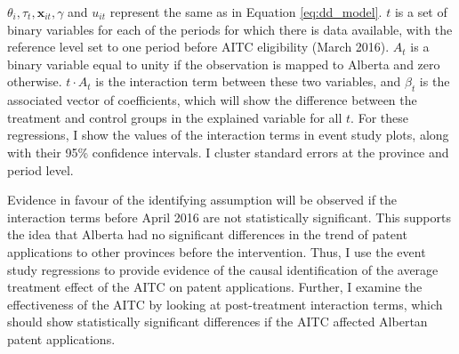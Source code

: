 \documentclass[../main.tex]{subfiles}
\begin{document}
$\theta_i, \tau_t, \mathbf{x}_{it}, \gamma$ and $u_{it}$ represent the same as in Equation \ref{eq:dd_model}. $t$ is a set of binary variables for each of the periods for which there is data available, with the reference level set to one period before AITC eligibility (March 2016). $A_t$ is a binary variable equal to unity if the observation is mapped to Alberta and zero otherwise. $t\cdot A_t$ is the interaction term between these two variables, and $\beta_t$ is the associated vector of coefficients, which will show the difference between the treatment and control groups in the explained variable for all $t$. For these regressions, I show the values of the interaction terms in event study plots, along with their 95\% confidence intervals. I cluster standard errors at the province and period level.  

Evidence in favour of the identifying assumption will be observed if the interaction terms before April 2016 are not statistically significant. This supports the idea that Alberta had no significant differences in the trend of patent applications to other provinces before the intervention. Thus, I use the event study regressions to provide evidence of the causal identification of the average treatment effect of the AITC on patent applications. Further, I examine the effectiveness of the AITC by looking at post-treatment interaction terms, which should show statistically significant differences if the AITC affected Albertan patent applications. 
\end{document}

